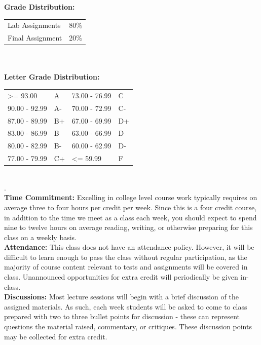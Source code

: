 \documentclass[11pt]{article}
\begin{document}
\textbf {\large Grade Distribution:} \\
\hspace*{40mm}
\begin{tabular}{ l l }
Lab Assignments & 80\% \\
Final Assignment & 20\% \\
\end{tabular} \\\\

\textbf {\large Letter Grade Distribution:} \\
\hspace*{40mm}
\begin{tabular}{ l l | l l }
\textgreater= 93.00 & A & 73.00 - 76.99 & C \\
90.00 - 92.99 & A-  & 70.00 - 72.99 & C- \\
87.00 - 89.99 & B+  & 67.00 - 69.99 & D+ \\
83.00 - 86.99 & B  & 63.00 - 66.99 & D \\
80.00 - 82.99 & B-  & 60.00 - 62.99 & D- \\
77.00 - 79.99 & C+  & \textless= 59.99 & F \\
\end{tabular} \\
.\\
\textbf {\large Time Commitment:} Excelling in college level course work typically requires on average three to four hours per credit per week.  Since this is a four credit course, in addition to the time we meet as a class each week, you should expect to spend nine to twelve hours on average reading, writing, or otherwise preparing for this class on a weekly basis.\\

\textbf {\large Attendance:} This class does not have an attendance policy.  However, it will be difficult to learn enough to pass the class without regular participation, as the majority of course content relevant to tests and assignments will be covered in class.  Unannounced opportunities for extra credit will periodically be given in-class.\\

\textbf {\large Discussions:} Most lecture sessions will begin with a brief discussion of the assigned materials.  As such, each week students will be asked to come to class prepared with two to three bullet points for discussion - these can represent questions the material raised, commentary, or critiques.  These discussion points may be collected for extra credit.\\
\end{document}
